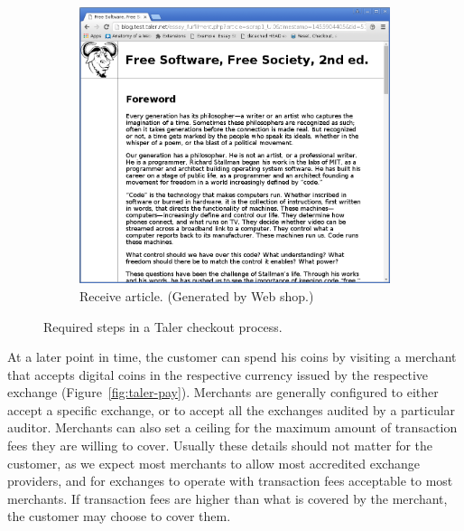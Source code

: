 \documentclass{IEEEtran}
\begin{document}
\begin{figure}[b!]
\begin{subfigure}{0.5\textwidth}
\includegraphics[width=\textwidth]{figs/fulfillment.png}
\caption{Receive article. (Generated by Web shop.)}
\label{subfig:fulfillment}
\end{subfigure}
\caption{Required steps in a Taler checkout process.}
\label{fig:shopping}
\end{figure}


At a later point in time, the customer can spend his coins by
visiting a merchant that accepts digital coins in the respective
currency issued by the respective exchange
(Figure~\ref{fig:taler-pay}).  Merchants are generally configured to
either accept a specific exchange, or to accept all the exchanges
audited by a particular auditor.  Merchants can also set a ceiling for
the maximum amount of transaction fees they are willing to cover.
Usually these details should not matter for the customer, as we expect
most merchants to allow most accredited exchange providers, and for
exchanges to operate with transaction fees acceptable to most
merchants.  If transaction fees are higher than what is covered by the
merchant, the customer may choose to cover them.
\end{document}
